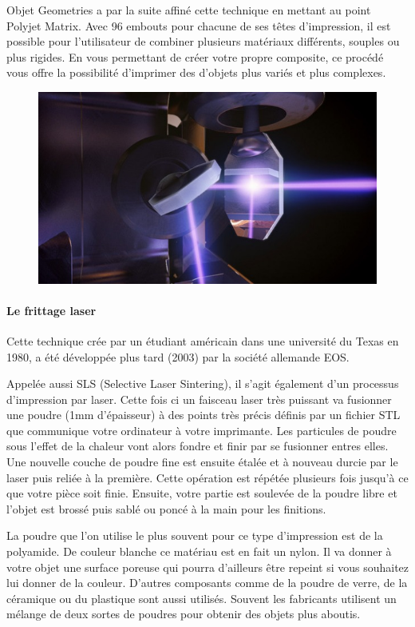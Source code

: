 \documentclass{article}
\begin{document}
Objet Geometries a par la suite affiné cette technique en mettant au point Polyjet Matrix. Avec 96 embouts pour chacune de ses têtes d'impression, il est possible pour l'utilisateur de combiner plusieurs matériaux différents, souples ou plus rigides. En vous permettant de créer votre propre composite, ce procédé vous offre la possibilité d'imprimer des d'objets plus variés et plus complexes.

\begin{figure}[h!]
\centering
\includegraphics[scale=0.4]{./images/procede-polyjet.png}
\end{figure}
\newpage
\paragraph{Le frittage laser} \hfill

Cette technique crée par un étudiant américain dans une université du Texas en 1980, a été développée plus tard (2003) par la société allemande EOS.\hfill \

Appelée aussi SLS (Selective Laser Sintering), il s'agit également d'un processus d'impression par laser. Cette fois ci un faisceau laser très puissant va fusionner une poudre (1mm d'épaisseur) à des points très précis définis par un fichier STL que communique votre ordinateur à votre imprimante. Les particules de poudre sous l'effet de la chaleur vont alors fondre et finir par se fusionner entres elles. Une nouvelle couche de poudre fine est ensuite étalée et à nouveau durcie par le laser puis reliée à la première. Cette opération est répétée plusieurs fois jusqu'à ce que votre pièce soit finie. Ensuite, votre partie est soulevée de la poudre libre et l'objet est brossé puis sablé ou poncé à la main pour les finitions.\hfill

La poudre que l'on utilise le plus souvent pour ce type d'impression est de la polyamide. De couleur blanche ce matériau est en fait un nylon. Il va donner à votre objet une surface poreuse qui pourra d'ailleurs être repeint si vous souhaitez lui donner de la couleur. D'autres composants comme de la poudre de verre, de la céramique ou du plastique sont aussi utilisés. Souvent les fabricants utilisent un mélange de deux sortes de poudres pour obtenir des objets plus aboutis.\hfill
\end{document}
